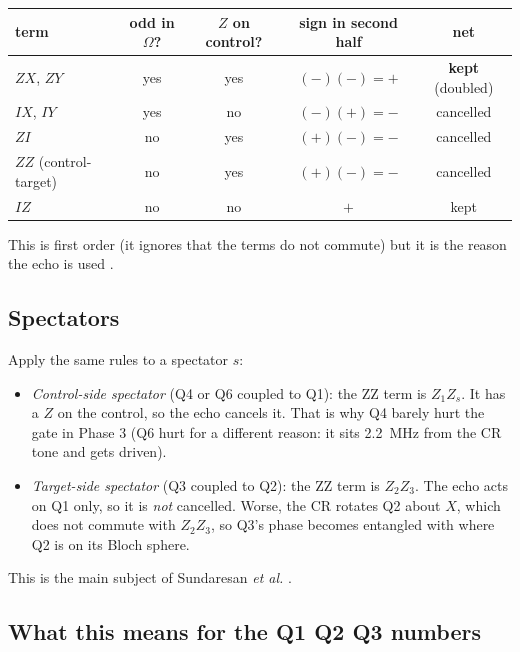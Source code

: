 \documentclass[11pt,a4paper]{article}
\begin{document}
\begin{center}\small
\begin{tabular}{@{}l c c c c@{}}
\toprule
term & odd in \(\Omega\)? & \(Z\) on control? & sign in second half & net \\
\midrule
\(Z\!X\), \(Z\!Y\) & yes & yes & \((-)(-) = +\) & \textbf{kept} (doubled) \\
\(I\!X\), \(I\!Y\) & yes & no & \((-)(+) = -\) & cancelled \\
\(Z\!I\) & no & yes & \((+)(-) = -\) & cancelled \\
\(Z\!Z\) (control-target) & no & yes & \((+)(-) = -\) & cancelled \\
\(I\!Z\) & no & no & \(+\) & kept \\
\bottomrule
\end{tabular}
\end{center}

This is first order (it ignores that the terms do not commute) but it is the reason the echo is used
\cite{corcoles2013,sheldon2016}.

\subsection{Spectators}\label{sec:spectators}

Apply the same rules to a spectator \(s\):
\begin{itemize}
\item \emph{Control-side spectator} (Q4 or Q6 coupled to Q1): the ZZ term is \(Z_1Z_s\). It has a \(Z\) on the control,
  so the echo cancels it. That is why Q4 barely hurt the gate in Phase 3 (Q6 hurt for a different reason: it sits
  2.2~MHz from the CR tone and gets driven).
\item \emph{Target-side spectator} (Q3 coupled to Q2): the ZZ term is \(Z_2Z_3\). The echo acts on Q1 only, so it
  is \emph{not} cancelled. Worse, the CR rotates Q2 about \(X\), which does not commute with \(Z_2Z_3\), so Q3's phase
  becomes entangled with where Q2 is on its Bloch sphere.
\end{itemize}
This is the main subject of Sundaresan \emph{et al.} \cite{sundaresan2020}.

\subsection{What this means for the Q1 Q2 Q3 numbers}
\end{document}
